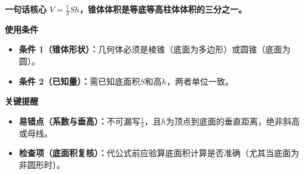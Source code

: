 \begin{summarybox}
	\textbf{\textcolor{CSummary}{一句话核心}}
	\textbf{$V=\frac{1}{3}Sh$，锥体体积是等底等高柱体体积的三分之一。}

	\medskip
	\textbf{\textcolor{CSummary}{使用条件}}
	\begin{itemize}[leftmargin=*, itemsep=0.5em, topsep=0.4em]
		\item \textbf{条件 1（锥体形状）：}几何体必须是棱锥（底面为多边形）或圆锥（底面为圆）。
		\item \textbf{条件 2（已知量）：}需已知底面积$S$和高$h$，两者单位一致。
	\end{itemize}

	\medskip
	\textbf{\textcolor{CSummary}{关键提醒}}
	\begin{itemize}[leftmargin=*, itemsep=0.5em, topsep=0.4em]
		\item \textbf{易错点（系数与垂高）：}不可漏写$\frac{1}{3}$，且$h$为顶点到底面的垂直距离，绝非斜高或母线。
		\item \textbf{检查项（底面积复核）：}代公式前应验算底面积计算是否准确（尤其当底面为非圆形时）。
	\end{itemize}

\end{summarybox}
